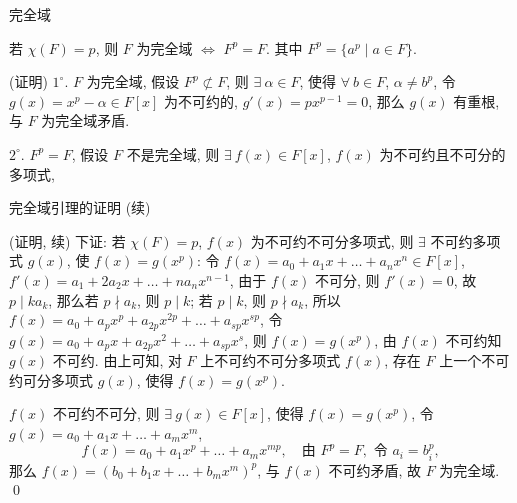
\begin{frame}{完全域}

\begin{lem}[完全域]
若 $\chi(F) = p$, 则 $F$ 为完全域 $\iff$ $F^p = F$.
其中 $F^p = \{ a^p \mid a \in F \}$.
\end{lem}

\startproof[bg=yellow, fg=red](证明)
$1^{\circ}$. $F$ 为完全域, 假设 $F^p \not\subset F$,
则 $\exists\ \alpha \in F$, 使得 $\forall\ b \in F$, $\alpha \neq b^p$,
令 $g(x) = x^p - \alpha \in F[x]$ 为不可约的, $g'(x) = p x^{p-1} = 0$,
那么 $g(x)$ 有重根, 与 $F$ 为完全域矛盾.

\pause

$2^{\circ}$. $F^p = F$, 假设 $F$ 不是完全域,
则 $\exists\ f(x) \in F[x]$, $f(x)$ 为不可约且不可分的多项式,

\end{frame}


\begin{frame}{完全域引理的证明 (续)}

\startproof[bg=yellow, fg=red](证明, 续)
下证: 若 $\chi(F) = p$, $f(x)$ 为不可约不可分多项式,
则 $\exists$ 不可约多项式 $g(x)$, 使 $f(x) = g(x^p)$:
令 $f(x) = a_0 + a_1 x + \dots + a_n x^n \in F[x]$,
$f'(x) = a_1 + 2 a_2 x + \dots + n a_n x^{n-1}$, 由于 $f(x)$ 不可分, 则 $f'(x) = 0$,
故 $p \mid k a_k$, 那么若 $p \nmid a_k$, 则 $p \mid k$; 若 $p \mid k$, 则 $p \nmid a_k$,
所以 $f(x) = a_0 + a_p x^p + a_{2p} x^{2p} + \dots + a_{sp} x^{sp}$,
令 $g(x) = a_0 + a_p x + a_{2p} x^2 + \dots + a_{sp} x^s$, 则 $f(x) = g(x^p)$,
由 $f(x)$ 不可约知 $g(x)$ 不可约.
由上可知, 对 $F$ 上不可约不可分多项式 $f(x)$, 存在 $F$ 上一个不可约可分多项式
$g(x)$, 使得 $f(x) = g(x^p)$.

\pause

$f(x)$ 不可约不可分, 则 $\exists\ g(x) \in F[x]$, 使得 $f(x) = g(x^p)$,
令 $g(x) = a_0 + a_1 x + \dots + a_m x^m$,
\[
f(x) = a_0 + a_1 x^p + \dots + a_m x^{mp}, \quad \text{由 } F^p = F, \text{ 令 } a_i = b_i^p,
\]
那么 $f(x) = (b_0 + b_1 x + \dots + b_m x^m)^p$, 与 $f(x)$ 不可约矛盾,
故 $F$ 为完全域.
\qed

\end{frame}


